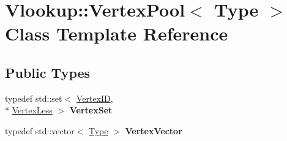 \hypertarget{class_vlookup_1_1_vertex_pool}{\section{Vlookup\+:\+:Vertex\+Pool$<$ Type $>$ Class Template Reference}
\label{class_vlookup_1_1_vertex_pool}
}
\subsection*{Public Types}
\begin{DoxyCompactItemize}
\item 
\hypertarget{class_vlookup_1_1_vertex_pool_ae54d13cba064b9580a2d0a8c80815046}{typedef std\+::set$<$ \hyperlink{struct_vlookup_1_1_vertex_i_d}{Vertex\+I\+D}, \\*
\hyperlink{class_vlookup_1_1_vertex_less}{Vertex\+Less} $>$ {\bfseries Vertex\+Set}}\label{class_vlookup_1_1_vertex_pool_ae54d13cba064b9580a2d0a8c80815046}

\item 
\hypertarget{class_vlookup_1_1_vertex_pool_add271e25cd123c7a6dc3ca4aac3c9a60}{typedef std\+::vector$<$ \hyperlink{struct_type}{Type} $>$ {\bfseries Vertex\+Vector}}\label{class_vlookup_1_1_vertex_pool_add271e25cd123c7a6dc3ca4aac3c9a60}

\end{DoxyCompactItemize}

